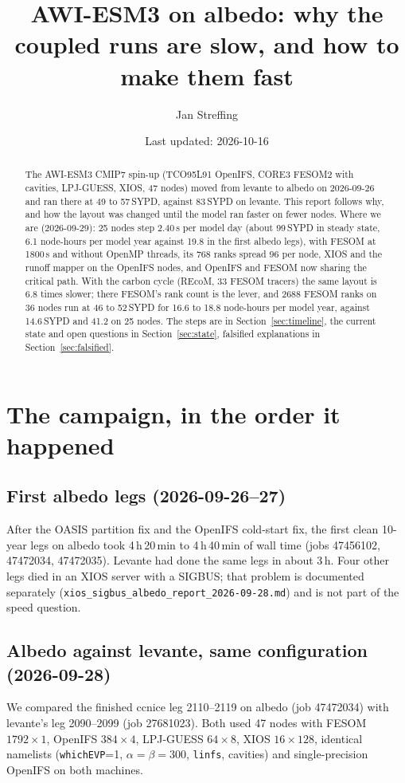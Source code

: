 \documentclass[11pt,a4paper]{article}
\title{AWI-ESM3 on albedo: why the coupled runs are slow, and how to make them fast}
\author{Jan Streffing}
\date{Last updated: 2026-10-16}
\begin{document}
\maketitle

\begin{abstract}
The AWI-ESM3 CMIP7 spin-up (TCO95L91 OpenIFS, CORE3 FESOM2 with cavities, LPJ-GUESS, XIOS, 47 nodes) moved from levante to albedo on 2026-09-26 and ran there at 49 to 57\,SYPD, against 83\,SYPD on levante. This report follows why, and how the layout was changed until the model ran faster on fewer nodes. Where we are (2026-09-29): 25 nodes step 2.40\,s per model day (about 99\,SYPD in steady state, 6.1 node-hours per model year against 19.8 in the first albedo legs), with FESOM at 1800\,s and without OpenMP threads, its 768 ranks spread 96 per node, XIOS and the runoff mapper on the OpenIFS nodes, and OpenIFS and FESOM now sharing the critical path. With the carbon cycle (REcoM, 33 FESOM tracers) the same layout is 6.8 times slower; there FESOM's rank count is the lever, and 2688 FESOM ranks on 36 nodes run at 46 to 52\,SYPD for 16.6 to 18.8 node-hours per model year, against 14.6\,SYPD and 41.2 on 25 nodes. The steps are in Section~\ref{sec:timeline}, the current state and open questions in Section~\ref{sec:state}, falsified explanations in Section~\ref{sec:falsified}.
\end{abstract}

\section{The campaign, in the order it happened}\label{sec:timeline}

\subsection{First albedo legs (2026-09-26--27)}
After the OASIS partition fix and the OpenIFS cold-start fix, the first clean 10-year legs on albedo took 4\,h\,20\,min to 4\,h\,40\,min of wall time (jobs 47456102, 47472034, 47472035). Levante had done the same legs in about 3\,h. Four other legs died in an XIOS server with a SIGBUS; that problem is documented separately (\texttt{xios\_sigbus\_albedo\_report\_2026-09-28.md}) and is not part of the speed question.

\subsection{Albedo against levante, same configuration (2026-09-28)}
We compared the finished ccnice leg 2110--2119 on albedo (job 47472034) with levante's leg 2090--2099 (job 27681023). Both used 47 nodes with FESOM $1792\times1$, OpenIFS $384\times4$, LPJ-GUESS $64\times8$, XIOS $16\times128$, identical namelists (\texttt{whichEVP}=1, $\alpha=\beta=300$, \texttt{linfs}, cavities) and single-precision OpenIFS on both machines.
\end{document}
